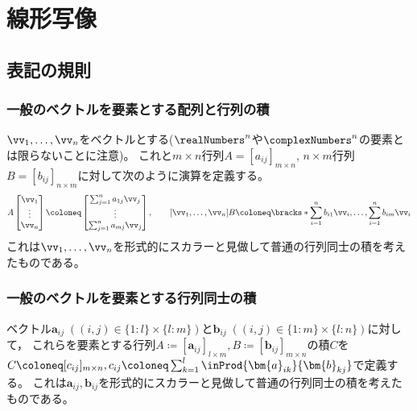 \chapter{線形写像}
    \section{表記の規則}
        \subsection{一般のベクトルを要素とする配列と行列の積}
            $\vv_1,\dotsc,\vv_n$をベクトルとする($\realNumbers^n$や$\complexNumbers^n$の要素とは限らないことに注意)。
            これと$m\times n$行列$A=[a_{ij}]_{m\times n}$, $n\times m$行列$B=[b_{ij}]_{n\times m}$に対して次のように演算を定義する。
            \[
                A
                \begin{bmatrix}
                    \vv_1 \\
                    \vdots \\
                    \vv_n
                \end{bmatrix} \coloneq
                \begin{bmatrix}
                    \sum_{j=1}^n a_{1j}\vv_j \\
                    \vdots \\
                    \sum_{j=1}^n a_{mj}\vv_j
                \end{bmatrix},
                \qquad
                [\vv_1,\dotsc,\vv_n]B \coloneq
                \bracks*{\sum_{i=1}^n b_{i1}\vv_i, \dotsc, \sum_{i=1}^n b_{im}\vv_i }
            \]
            これは$\vv_1,\dotsc,\vv_n$を形式的にスカラーと見做して普通の行列同士の積を考えたものである。
        \subsection{一般のベクトルを要素とする行列同士の積}
            ベクトル$\bm{a}_{ij}\;((i,j)\in\{1:l\}\times\{l:m\})$と$\bm{b}_{ij}\;((i,j)\in\{1:m\}\times\{l:n\})$に対して，
            これらを要素とする行列$A\coloneq[\bm{a}_{ij}]_{l\times m},B\coloneq[\bm{b}_{ij}]_{m\times n}$の積$C$を
            $C\coloneq[c_{ij}]_{m\times n},c_{ij} \coloneq \sum_{k=1}^l \inProd{\bm{a}_{ik}}{\bm{b}_{kj}}$で定義する。
            これは$\bm{a}_{ij},\bm{b}_{ij}$を形式的にスカラーと見做して普通の行列同士の積を考えたものである。

